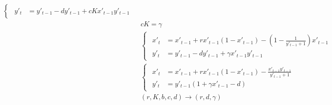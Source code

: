 \documentclass{article}
\begin{document}
\begin{align}
\begin{cases}
\begin{aligned}
				y'_t &= y'_{t-1} - dy'_{t-1} + cK x'_{t-1} y'_{t-1}
			\end{aligned}
		\end{cases}
		\\[1em]
		& cK = \gamma
		\\[1em]
		&\begin{cases}
			\begin{aligned}
				x'_t &= x'_{t-1} + rx'_{t-1} (1 - x'_{t-1}) - \left( 1 - \frac{1}{y'_{t-1}+1} \right) x'_{t-1} \\
				y'_t &= y'_{t-1} - dy'_{t-1} + \gamma x'_{t-1} y'_{t-1}
			\end{aligned}
		\end{cases}
		\\[1em]
		&\begin{cases}
			\begin{aligned}
				x'_t &= x'_{t-1} + rx'_{t-1} (1 - x'_{t-1}) - \frac{ x'_{t-1} y'_{t-1}}{y'_{t-1}+1} \\
				y'_t &= y'_{t-1} (1 + \gamma x'_{t-1} - d) 
			\end{aligned}
		\end{cases}
		\\[1em]
		&(r, K, b, c, d) \rightarrow (r, d, \gamma)
	\end{align}
\end{document}
